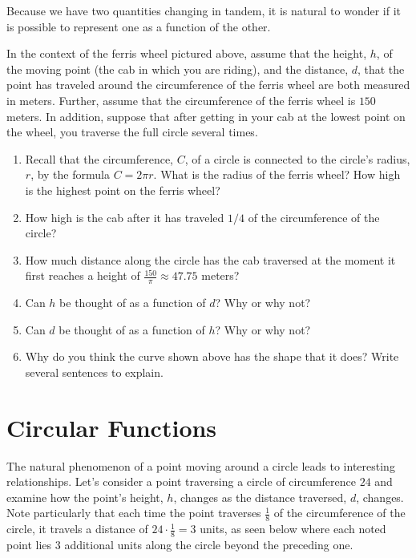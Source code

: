 \documentclass[nooutcomes, noauthor]{ximera}
\begin{document}
Because we have two quantities changing in tandem, it is natural to wonder if it is possible to represent one as a function of the other.%
\begin{exploration}
\hypertarget{p-841}{}%
In the context of the ferris wheel pictured above, assume that the height, \(h\), of the moving point (the cab in which you are riding), and the distance, \(d\), that the point has traveled around the circumference of the ferris wheel are both measured in meters.  Further, assume that the circumference of the ferris wheel is \(150\) meters.  In addition, suppose that after getting in your cab at the lowest point on the wheel, you traverse the full circle several times.%

\begin{enumerate}[label=\alph*.]
\item
Recall that the circumference, \(C\), of a circle is connected to the circle's radius, \(r\), by the formula \(C = 2\pi r\).  What is the radius of the ferris wheel?  How high is the highest point on the ferris wheel?%
\item
How high is the cab after it has traveled \(1/4\) of the circumference of the circle?%
\item
How much distance along the circle has the cab traversed at the moment it first reaches a height of \(\frac{150}{\pi} \approx 47.75\) meters?%
\item
Can \(h\) be thought of as a function of \(d\)?  Why or why not?%
\item
Can \(d\) be thought of as a function of \(h\)?  Why or why not?%
\item
Why do you think the curve shown above has the shape that it does?  Write several sentences to explain.%
\end{enumerate}

\end{exploration}






\section{Circular Functions}

The natural phenomenon of a point moving around a circle leads to interesting relationships.  Let's consider a point traversing a circle of circumference \(24\) and examine how the point's height, \(h\), changes as the distance traversed, \(d\), changes.  Note particularly that each time the point traverses \(\frac{1}{8}\) of the circumference of the circle, it travels a distance of \(24 \cdot \frac{1}{8} = 3\) units, as seen below where each noted point lies \(3\) additional units along the circle beyond the preceding one.%
\end{document}
